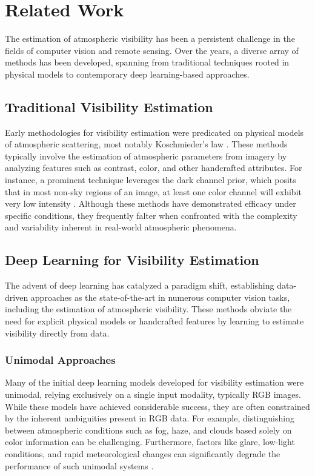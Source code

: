 \section{Related Work}
\label{sec:related_work}

The estimation of atmospheric visibility has been a persistent challenge in the fields of computer vision and remote sensing. Over the years, a diverse array of methods has been developed, spanning from traditional techniques rooted in physical models to contemporary deep learning-based approaches.

\subsection{Traditional Visibility Estimation}

Early methodologies for visibility estimation were predicated on physical models of atmospheric scattering, most notably Koschmieder's law \cite{koschmieder1924theorie}. These methods typically involve the estimation of atmospheric parameters from imagery by analyzing features such as contrast, color, and other handcrafted attributes. For instance, a prominent technique leverages the dark channel prior, which posits that in most non-sky regions of an image, at least one color channel will exhibit very low intensity \cite{he2010single}. Although these methods have demonstrated efficacy under specific conditions, they frequently falter when confronted with the complexity and variability inherent in real-world atmospheric phenomena.

\subsection{Deep Learning for Visibility Estimation}

The advent of deep learning has catalyzed a paradigm shift, establishing data-driven approaches as the state-of-the-art in numerous computer vision tasks, including the estimation of atmospheric visibility. These methods obviate the need for explicit physical models or handcrafted features by learning to estimate visibility directly from data.

\subsubsection{Unimodal Approaches}

Many of the initial deep learning models developed for visibility estimation were unimodal, relying exclusively on a single input modality, typically RGB images. While these models have achieved considerable success, they are often constrained by the inherent ambiguities present in RGB data. For example, distinguishing between atmospheric conditions such as fog, haze, and clouds based solely on color information can be challenging. Furthermore, factors like glare, low-light conditions, and rapid meteorological changes can significantly degrade the performance of such unimodal systems \cite{Bouhsine2022, AitOuadil2023}.

